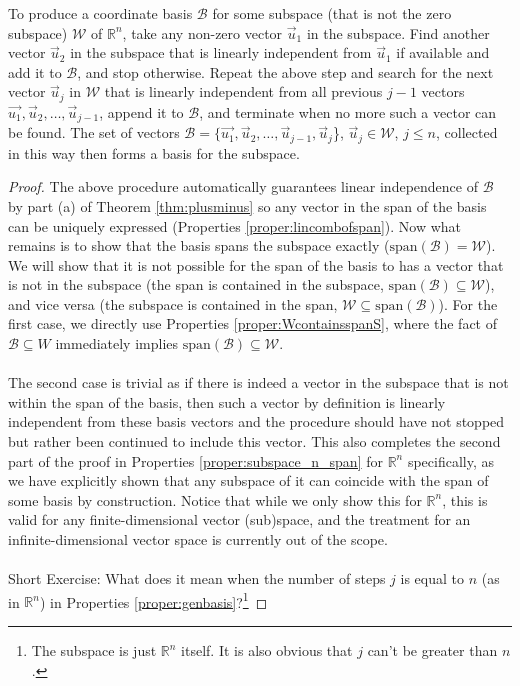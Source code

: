 \begin{proper}
\label{proper:genbasis}
To produce a coordinate basis $\mathcal{B}$ for some subspace (that is not the zero subspace) $\mathcal{W}$ of $\mathbb{R}^n$, take any non-zero vector $\vec{u}_1$ in the subspace. Find another vector $\vec{u}_2$ in the subspace that is linearly independent from $\vec{u}_1$ if available and add it to $\mathcal{B}$, and stop otherwise. Repeat the above step and search for the next vector $\vec{u}_j$ in $\mathcal{W}$ that is linearly independent from all previous $j-1$ vectors $\vec{u_1}, \vec{u}_2, \ldots, \vec{u}_{j-1}$, append it to $\mathcal{B}$, and terminate when no more such a vector can be found. The set of vectors $\mathcal{B} = \{\vec{u_1}, \vec{u}_2, \ldots, \vec{u}_{j-1}, \vec{u}_j$\}, $\vec{u}_j \in \mathcal{W}$, $j \leq n$, collected in this way then forms a basis for the subspace.
\end{proper}
\begin{proof}
The above procedure automatically guarantees linear independence of $\mathcal{B}$ by part (a) of Theorem \ref{thm:plusminus} so any vector in the span of the basis can be uniquely expressed (Properties \ref{proper:lincombofspan}). Now what remains is to show that the basis spans the subspace exactly ($\text{span}(\mathcal{B}) = \mathcal{W}$). We will show that it is not possible for the span of the basis to has a vector that is not in the subspace (the span is contained in the subspace, $\text{span}(\mathcal{B}) \subseteq \mathcal{W}$), and vice versa (the subspace is contained in the span, $\mathcal{W} \subseteq \text{span}(\mathcal{B})$). For the first case, we directly use Properties \ref{proper:WcontainsspanS}, where the fact of $\mathcal{B} \subseteq W$ immediately implies $\text{span}(\mathcal{B}) \subseteq \mathcal{W}$. \\
\\
The second case is trivial as if there is indeed a vector in the subspace that is not within the span of the basis, then such a vector by definition is linearly independent from these basis vectors and the procedure should have not stopped but rather been continued to include this vector. This also completes the second part of the proof in Properties \ref{proper:subspace_n_span} for $\mathbb{R}^n$ specifically, as we have explicitly shown that any subspace of it can coincide with the span of some basis by construction. Notice that while we only show this for $\mathbb{R}^n$, this is valid for any finite-dimensional vector (sub)space, and the treatment for an infinite-dimensional vector space is currently out of the scope. \\
\\
Short Exercise: What does it mean when the number of steps $j$ is equal to $n$ (as in $\mathbb{R}^n$) in Properties \ref{proper:genbasis}?\footnote{The subspace is just $\mathbb{R}^n$ itself. It is also obvious that $j$ can't be greater than $n$.}
\end{proof}


